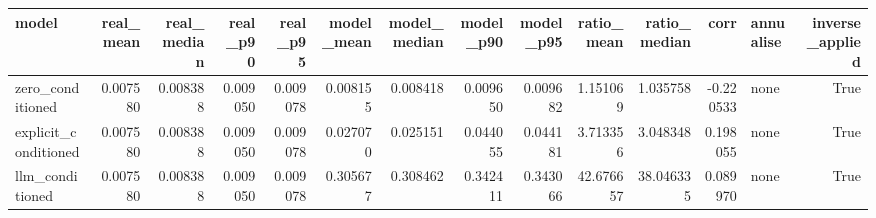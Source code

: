\begin{tabular}{lrrrrrrrrrrrlr}
\toprule
model & real_mean & real_median & real_p90 & real_p95 & model_mean & model_median & model_p90 & model_p95 & ratio_mean & ratio_median & corr & annualise & inverse_applied \\
\midrule
zero_conditioned & 0.007580 & 0.008388 & 0.009050 & 0.009078 & 0.008155 & 0.008418 & 0.009650 & 0.009682 & 1.151069 & 1.035758 & -0.220533 & none & True \\
explicit_conditioned & 0.007580 & 0.008388 & 0.009050 & 0.009078 & 0.027070 & 0.025151 & 0.044055 & 0.044181 & 3.713356 & 3.048348 & 0.198055 & none & True \\
llm_conditioned & 0.007580 & 0.008388 & 0.009050 & 0.009078 & 0.305677 & 0.308462 & 0.342411 & 0.343066 & 42.676657 & 38.046335 & 0.089970 & none & True \\
\bottomrule
\end{tabular}
